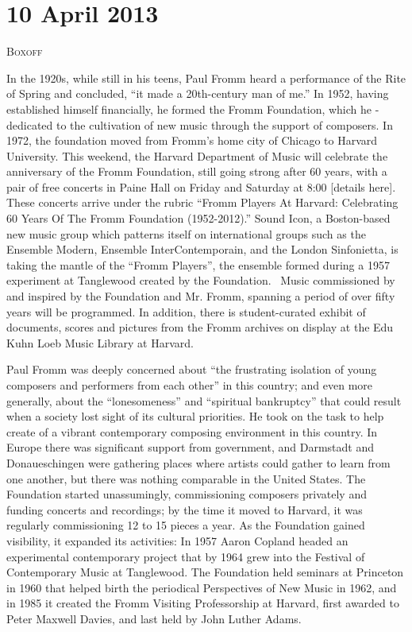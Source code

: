 \chapter{10 April 2013}

\textsc{Boxoff}

In the 1920s, while still in his teens, Paul Fromm heard a performance of the Rite of Spring and concluded, “it made a 20th-century man of me.” In 1952, having established himself financially, he formed the Fromm Foundation, which he -dedicated to the cultivation of new music through the support of composers. In 1972, the foundation moved from Fromm’s home city of Chicago to Harvard University. This weekend, the Harvard Department of Music will celebrate the anniversary of the Fromm Foundation, still going strong after 60 years, with a pair of free concerts in Paine Hall on Friday and Saturday at 8:00 [details here]. These concerts arrive under the rubric “Fromm Players At Harvard: Celebrating 60 Years Of The Fromm Foundation (1952-2012).” Sound Icon, a Boston-based new music group which patterns itself on international groups such as the Ensemble Modern, Ensemble InterContemporain, and the London Sinfonietta, is taking the mantle of the “Fromm Players”, the ensemble formed during a 1957 experiment at Tanglewood created by the Foundation.  Music commissioned by and inspired by the Foundation and Mr. Fromm, spanning a period of over fifty years will be programmed. In addition, there is student-curated exhibit of documents, scores and pictures from the Fromm archives on display at the Edu Kuhn Loeb Music Library at Harvard.

Paul Fromm was deeply concerned about “the frustrating isolation of young composers and performers from each other” in this country; and even more generally, about the “lonesomeness” and “spiritual bankruptcy” that could result when a society lost sight of its cultural priorities. He took on the task to help create of a vibrant contemporary composing environment in this country. In Europe there was significant support from government, and Darmstadt and Donaueschingen were gathering places where artists could gather to learn from one another, but there was nothing comparable in the United States. The Foundation started unassumingly, commissioning composers privately and funding concerts and recordings; by the time it moved to Harvard, it was regularly commissioning 12 to 15 pieces a year. As the Foundation gained visibility, it expanded its activities: In 1957 Aaron Copland headed an experimental contemporary project that by 1964 grew into the Festival of Contemporary Music at Tanglewood. The Foundation held seminars at Princeton in 1960 that helped birth the periodical Perspectives of New Music in 1962, and in 1985 it created the Fromm Visiting Professorship at Harvard, first awarded to Peter Maxwell Davies, and last held by John Luther Adams.

